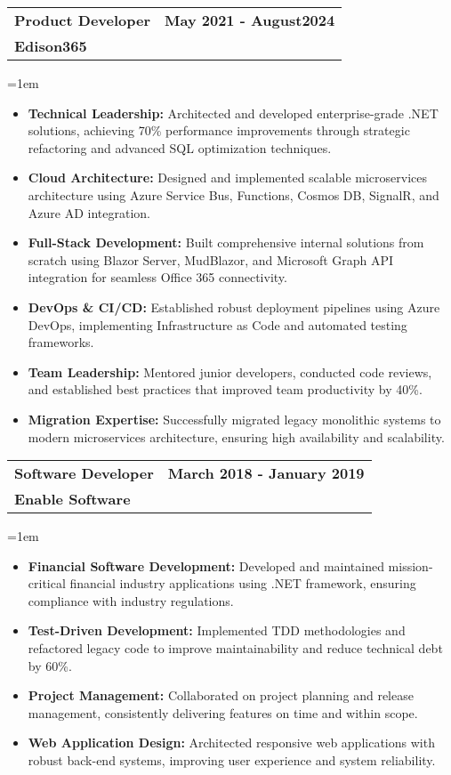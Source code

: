 \documentclass[paper=a4,fontsize=11pt]{article}
\makeatletter
\newcommand{\WorkEntry}[4]{
	\noindent
	\begin{tabularx}{\textwidth}{@{}X r@{}}
		\textbf{\large\color{primary}#1} & \textbf{\color{secondary}#2} \\
		\textbf{\color{secondary}#3} & \\
	\end{tabularx}
	\vspace{4pt}
	\noindent\hangindent=1em\hangafter=0 #4
	\vspace{8pt}
}
\makeatother
\begin{document}
\WorkEntry{Product Developer}{May 2021 - August2024}{Edison365}{\begin{itemize}
\item \textbf{Technical Leadership:} Architected and developed enterprise-grade .NET solutions, achieving 70\% performance improvements through strategic refactoring and advanced SQL optimization techniques.
\item \textbf{Cloud Architecture:} Designed and implemented scalable microservices architecture using Azure Service Bus, Functions, Cosmos DB, SignalR, and Azure AD integration.
\item \textbf{Full-Stack Development:} Built comprehensive internal solutions from scratch using Blazor Server, MudBlazor, and Microsoft Graph API integration for seamless Office 365 connectivity.
\item \textbf{DevOps \& CI/CD:} Established robust deployment pipelines using Azure DevOps, implementing Infrastructure as Code and automated testing frameworks.
\item \textbf{Team Leadership:} Mentored junior developers, conducted code reviews, and established best practices that improved team productivity by 40\%.
\item \textbf{Migration Expertise:} Successfully migrated legacy monolithic systems to modern microservices architecture, ensuring high availability and scalability.
\end{itemize}}

\WorkEntry{Software Developer}{March 2018 - January 2019}{Enable Software}{\begin{itemize}
\item \textbf{Financial Software Development:} Developed and maintained mission-critical financial industry applications using .NET framework, ensuring compliance with industry regulations.
\item \textbf{Test-Driven Development:} Implemented TDD methodologies and refactored legacy code to improve maintainability and reduce technical debt by 60\%.
\item \textbf{Project Management:} Collaborated on project planning and release management, consistently delivering features on time and within scope.
\item \textbf{Web Application Design:} Architected responsive web applications with robust back-end systems, improving user experience and system reliability.
\end{itemize}}
\end{document}
